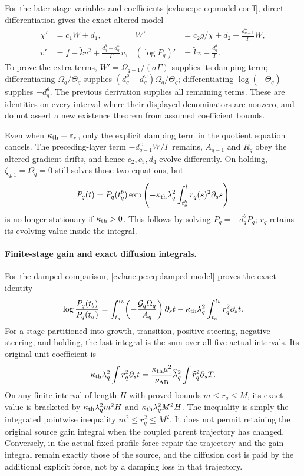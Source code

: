For the later-stage variables and coefficients \eqref{cvlane:pc:eq:model-coeff}, direct differentiation gives the exact altered model
\begin{align}\label{cvlane:pc:eq:damped-model}
 \chi'&=c_1W+d_1,&
 W'&=c_2g/\chi+d_2-\frac{d_{q-1}^\omega}{\Gamma}W,\\
 v'&=f-\widetilde k v^2+\frac{d_q^\theta-d_q^\omega}{\Gamma}v,&
 (\log P_q)'&=\widetilde k v-\frac{d_q^\theta}{\Gamma}.\nonumber
\end{align}
To prove the extra terms, $W'=\dot\Omega_{q-1}/(\sigma\Gamma)$ supplies its damping term; differentiating $\Omega_q/\Theta_q$ supplies $(d_q^\theta-d_q^\omega)\Omega_q/\Theta_q$; differentiating $\log(-\Theta_q)$ supplies $-d_q^\theta$. The previous derivation supplies all remaining terms. These are identities on every interval where their displayed denominators are nonzero, and do not assert a new existence theorem from assumed coefficient bounds.

Even when $\kappa_{\mathrm{th}}=\varepsilon_{\mathrm v}$, only the explicit damping term in the quotient equation cancels. The preceding-layer term $-d_{q-1}^\omega W/\Gamma$ remains, $A_{q-1}$ and $R_q$ obey the altered gradient drifts, and hence $c_2,c_5,d_4$ evolve differently. On holding, $\zeta_{q,1}=\Omega_q=0$ still solves those two equations, but
\[
 P_q(t)=P_q(t_q^b)\exp\left(-\kappa_{\mathrm{th}}\lambda_q^2\int_{t_q^b}^{t}r_q(s)^2\partial_s s\right)
\]
is no longer stationary if $\kappa_{\mathrm{th}}>0$. This follows by solving $\dot P_q=-d_q^\theta P_q$; $r_q$ retains its evolving value inside the integral.

\paragraph{Finite-stage gain and exact diffusion integrals.}
For the damped comparison, \eqref{cvlane:pc:eq:damped-model} proves the exact identity
\[
 \log\frac{P_q(t_b)}{P_q(t_a)}
 =\int_{t_a}^{t_b}\!\left(-\frac{\mathcal G_q\Omega_q}{A_q}\right)\partial_s t
 -\kappa_{\mathrm{th}}\lambda_q^2\int_{t_a}^{t_b}r_q^2\partial_s t.
\]
For a stage partitioned into growth, transition, positive steering, negative steering, and holding, the last integral is the sum over all five actual intervals. Its original-unit coefficient is
\[
 \kappa_{\mathrm{th}}\lambda_q^2\int r_q^2\partial_s t
 =\frac{\kappa_{\mathrm{th}}\mu^2}{\nu_{\mathrm{AB}}}\widehat\lambda_q^2
 \int \widehat r_q^2\partial_s T.
\]
On any finite interval of length $H$ with proved bounds $m\le r_q\le M$, its exact value is bracketed by $\kappa_{\mathrm{th}}\lambda_q^2m^2H$ and $\kappa_{\mathrm{th}}\lambda_q^2M^2H$. The inequality is simply the integrated pointwise inequality $m^2\le r_q^2\le M^2$. It does not permit retaining the original source gain integral when the coupled parent trajectory has changed. Conversely, in the actual fixed-profile force repair the trajectory and the gain integral remain exactly those of the source, and the diffusion cost is paid by the additional explicit force, not by a damping loss in that trajectory.

